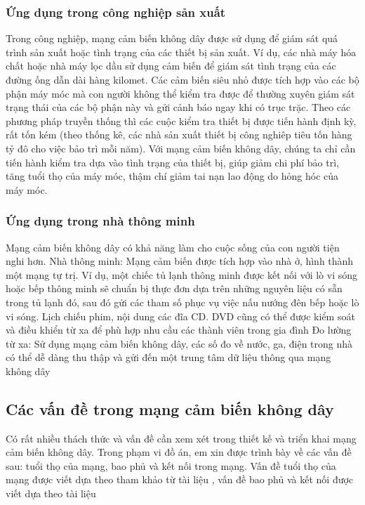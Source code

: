 \documentclass{article}
\begin{document}
\subsubsection{Ứng dụng trong công nghiệp sản xuất}
Trong công nghiệp, mạng cảm biến không dây được sử dụng để giám sát quá trình sản xuất hoặc tình trạng của các thiết bị sản xuất. Ví dụ, các nhà máy hóa chất hoặc nhà máy lọc dầu sử dụng cảm biến để giám sát tình trạng của các đường ống dẫn dài hàng kilomet. Các cảm biến siêu nhỏ được tích hợp vào các bộ phận máy móc mà con người không thể kiểm tra được  để thường xuyên giám sát trạng thái của các bộ phận này và gửi cảnh báo ngay khi có trục trặc. Theo các phương pháp truyền thống thì các cuộc kiểm tra thiết bị được tiến hành định kỳ, rất tốn kém (theo thống kê, các nhà sản xuất thiết bị công nghiêp tiêu tốn hàng tỷ đô cho việc bảo trì mỗi năm). Với mạng cảm biến không dây, chúng ta chỉ cần tiến hành kiểm tra dựa vào tình trạng của thiết bị, giúp giảm chi phí bảo trì, tăng tuổi thọ của máy móc, thậm chí giảm tai nạn lao động do hỏng hóc của máy móc.
\subsubsection{Ứng dụng trong nhà thông minh}
Mạng cảm biến không dây có khả năng làm cho cuộc sống của  con người tiện nghi hơn.
\newline Nhà thông minh: Mạng cảm biến được tích hợp vào nhà ở, hình thành một mạng tự trị. Ví dụ, một chiếc tủ lạnh thông minh được kết nối với lò vi sóng hoặc bếp thông minh sẽ chuẩn bị thực đơn dựa trên những nguyên liệu có sẵn trong tủ lạnh đó, sau đó gửi các tham số phục vụ việc nấu nướng đên bếp hoặc lò vi sóng. Lịch chiếu phim, nội dung các đĩa CD. DVD cũng có thể được kiểm soát và điều khiển từ xa để phù hợp nhu cầu các thành viên trong gia đình
\newline Đo lường từ xa: Sử dụng mạng cảm biến không dây, các số đo về nước, ga, điện trong nhà có thể dễ dàng thu thập và gửi đến một trung tâm dữ liệu thông qua mạng không dây
\subsection{Các vấn đề trong mạng cảm biến không dây}
Có rất nhiều thách thức và vấn đề cần xem xét trong thiết kế và triển khai mạng cảm biến không dây. Trong phạm vi đồ án, em xin được trình bày về các vấn đề sau: tuổi thọ của mạng, bao phủ và kết nối trong mạng. Vấn đề tuổi thọ của mạng được viết dựa theo tham khảo từ tài liệu \cite{dietrich2009lifetime}, vấn đề bao phủ và kết nối được viết dựa theo tài liệu \cite{fan2010coverage}
\end{document}
